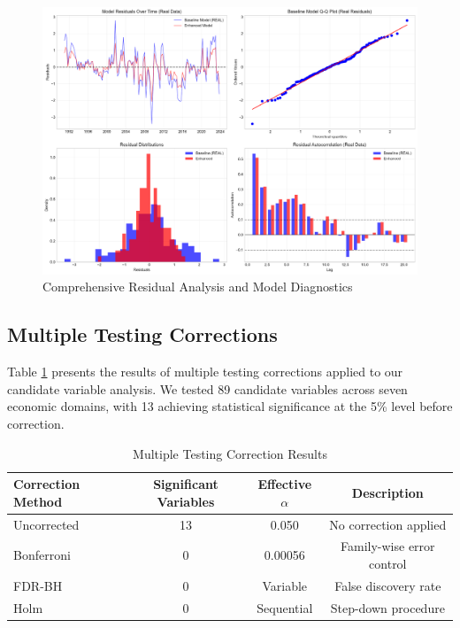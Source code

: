 \documentclass[12pt]{article}
\begin{document}
\begin{figure}[H]
\centering
\includegraphics[width=\textwidth]{figures/residual_analysis.pdf}
\caption{Comprehensive Residual Analysis and Model Diagnostics}
\label{fig:residual_analysis}
\end{figure}

\subsection{Multiple Testing Corrections}

Table \ref{tab:multiple} presents the results of multiple testing corrections applied to our candidate variable analysis. We tested 89 candidate variables across seven economic domains, with 13 achieving statistical significance at the 5\% level before correction.

\begin{table}[H]
\centering
\caption{Multiple Testing Correction Results}
\label{tab:multiple}
\begin{tabular}{lccc}
\toprule
Correction Method & Significant Variables & Effective $\alpha$ & Description \\
\midrule
Uncorrected & 13 & 0.050 & No correction applied \\
Bonferroni & 0 & 0.00056 & Family-wise error control \\
FDR-BH & 0 & Variable & False discovery rate \\
Holm & 0 & Sequential & Step-down procedure \\
\bottomrule
\end{tabular}
\end{table}
\end{document}
